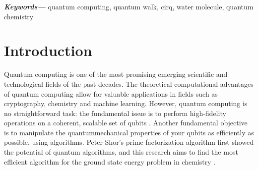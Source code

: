 \documentclass{article}
\providecommand{\keywords}[1]
{
  \small
  \textbf{\textit{Keywords---}} #1
}
\begin{document}

\keywords{quantum computing, quantum walk, cirq, water molecule, quantum chemistry}

\section{Introduction}

Quantum computing is one of the most promising emerging scientific and technological fields of the past decades. The theoretical computational advantages of quantum computing allow for valuable applications in fields such as cryptography, chemistry and machine learning. However, quantum computing is no straightforward task: the fundamental issue is to perform high-fidelity operations on a coherent, scalable set of qubits \cite{malley}. Another fundamental objective is to manipulate the quantummechanical properties of your qubits as efficiently as possible, using algorithms. Peter Shor's prime factorization algorithm first showed the potential of quantum algorithms, and this research aims to find the most efficient algorithm for the ground state energy problem in chemistry \cite{shor}.
\end{document}
